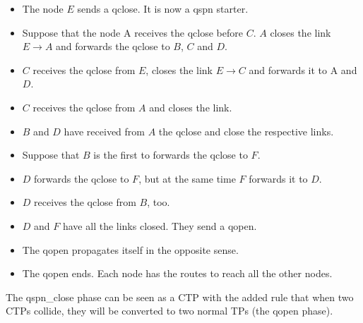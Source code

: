\documentclass[a4paper]{article}
\begin{document}
  \begin{itemize}
	  \item The node $E$ sends a qclose. It is now a qspn starter.
	  \item Suppose that the node A receives the qclose before $C$. $A$
		  closes the link $E\rightarrow A$ and forwards the qclose to
		  $B$, $C$ and $D$.
	  \item $C$ receives the qclose from $E$, closes the link $E\rightarrow C$ and forwards it to A and $D$.
	  \item $C$ receives the qclose from $A$ and closes the link.
	  \item $B$ and $D$ have received from $A$ the qclose and close the respective links.
	  \item Suppose that $B$ is the first to forwards the qclose to $F$.
	  \item $D$ forwards the qclose to $F$, but at the same time $F$ forwards it to $D$.
	  \item $D$ receives the qclose from $B$, too.
	  \item $D$ and $F$ have all the links closed. They send a qopen.
	  \item The qopen propagates itself in the opposite sense.
	  \item The qopen ends.  Each node has the routes to reach all the other nodes.
\end{itemize}

The qspn\_close phase can be seen
as a CTP with the added rule that when two CTPs collide, they will be
converted to two normal TPs (the qopen phase).
\end{document}
